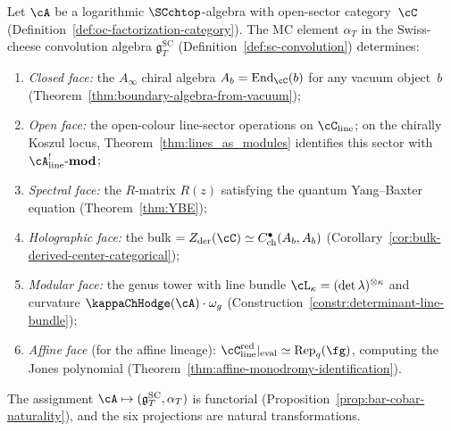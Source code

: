 \begin{theorem}
\label{thm:master-projection}
Let\/ $\cA$ be a logarithmic $\SCchtop$-algebra with open-sector
category\/~$\cC$
\textup{(}Definition~\textup{\ref{def:oc-factorization-category})}.
The MC element\/ $\alpha_T$ in the Swiss-cheese convolution algebra\/
$\mathfrak{g}^{\mathrm{SC}}_T$
\textup{(}Definition~\textup{\ref{def:sc-convolution})} determines:
\begin{enumerate}[label=\textup{(\roman*)}]
\item \emph{Closed face:} the $A_\infty$ chiral algebra
 $A_b = \mathrm{End}_\cC(b)$ for any vacuum object\/~$b$
 \textup{(}Theorem~\textup{\ref{thm:boundary-algebra-from-vacuum})};
\item \emph{Open face:} the open-colour line-sector operations on
 $\cC_{\mathrm{line}}$; on the chirally Koszul locus,
 Theorem~\textup{\ref{thm:lines_as_modules}} identifies this
 sector with
 $\cA^!_{\mathrm{line}}\textup{-}\mathbf{mod}$;
\item \emph{Spectral face:} the $R$-matrix $R(z)$ satisfying the
 quantum Yang--Baxter equation
 \textup{(}Theorem~\textup{\ref{thm:YBE})};
\item \emph{Holographic face:} the bulk
 $= Z_{\mathrm{der}}(\cC) \simeq
 C^\bullet_{\mathrm{ch}}(A_b, A_b)$
 \textup{(}Corollary~\textup{\ref{cor:bulk-derived-center-categorical})};
\item \emph{Modular face:} the genus tower with line bundle
 $\cL_\kappa = (\det\lambda)^{\otimes\kappa}$ and curvature
 $\kappaChHodge(\cA) \cdot \omega_g$
 \textup{(}Construction~\textup{\ref{constr:determinant-line-bundle})};
\item \emph{Affine face}
 \textup{(}for the affine lineage\textup{):}
 $\cC_{\mathrm{line}}^{\mathrm{red}}|_{\mathrm{eval}} \simeq
 \mathrm{Rep}_q(\fg)$, computing the Jones polynomial
 \textup{(}Theorem~\textup{\ref{thm:affine-monodromy-identification})}.
\end{enumerate}
The assignment $\cA \mapsto (\mathfrak{g}^{\mathrm{SC}}_T, \alpha_T)$ is
functorial
\textup{(}Proposition~\textup{\ref{prop:bar-cobar-naturality})}, and
the six projections are natural transformations.
\end{theorem}

